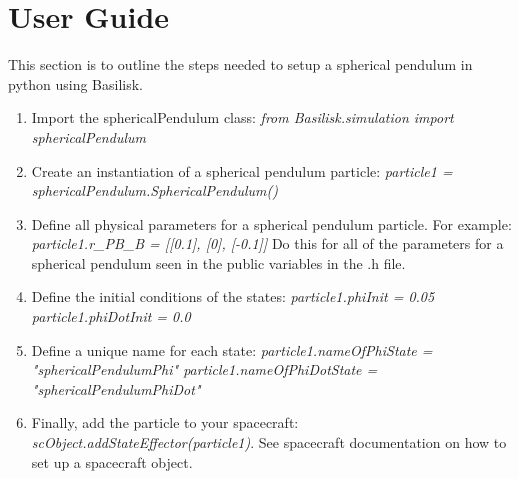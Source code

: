 \section{User Guide}

This section is to outline the steps needed to setup a spherical pendulum in python using Basilisk.

\begin{enumerate}
	\item Import the sphericalPendulum class: \newline \textit{from Basilisk.simulation import sphericalPendulum}
	\item Create an instantiation of a spherical pendulum particle: \newline \textit{particle1 = sphericalPendulum.SphericalPendulum()}
	\item Define all physical parameters for a spherical pendulum particle. For example: \newline
	\textit{particle1.r\_PB\_B = [[0.1], [0], [-0.1]]}
	Do this for all of the parameters for a spherical pendulum seen in the public variables in the .h file.
	\item Define the initial conditions of the states:\newline
	\textit{particle1.phiInit = 0.05 \quad particle1.phiDotInit = 0.0}
	\item Define a unique name for each state:\newline
	\textit{particle1.nameOfPhiState = "sphericalPendulumPhi" \quad particle1.nameOfPhiDotState = "sphericalPendulumPhiDot"}
	\item Finally, add the particle to your spacecraft:\newline
	\textit{scObject.addStateEffector(particle1)}. See spacecraft documentation on how to set up a spacecraft object.
\end{enumerate}
